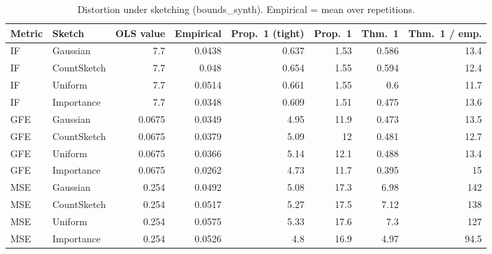 \begin{table}[t]
\centering
\small
\begin{tabular}{llrrrrrr}
\toprule
Metric & Sketch & OLS value & Empirical & Prop.~1 (tight) & Prop.~1 & Thm.~1 & Thm.~1 / emp. \\
\midrule
IF & Gaussian & 7.7 & 0.0438 & 0.637 & 1.53 & 0.586 & 13.4 \\
IF & CountSketch & 7.7 & 0.048 & 0.654 & 1.55 & 0.594 & 12.4 \\
IF & Uniform & 7.7 & 0.0514 & 0.661 & 1.55 & 0.6 & 11.7 \\
IF & Importance & 7.7 & 0.0348 & 0.609 & 1.51 & 0.475 & 13.6 \\
\midrule
GFE & Gaussian & 0.0675 & 0.0349 & 4.95 & 11.9 & 0.473 & 13.5 \\
GFE & CountSketch & 0.0675 & 0.0379 & 5.09 & 12 & 0.481 & 12.7 \\
GFE & Uniform & 0.0675 & 0.0366 & 5.14 & 12.1 & 0.488 & 13.4 \\
GFE & Importance & 0.0675 & 0.0262 & 4.73 & 11.7 & 0.395 & 15 \\
\midrule
MSE & Gaussian & 0.254 & 0.0492 & 5.08 & 17.3 & 6.98 & 142 \\
MSE & CountSketch & 0.254 & 0.0517 & 5.27 & 17.5 & 7.12 & 138 \\
MSE & Uniform & 0.254 & 0.0575 & 5.33 & 17.6 & 7.3 & 127 \\
MSE & Importance & 0.254 & 0.0526 & 4.8 & 16.9 & 4.97 & 94.5 \\
\bottomrule
\end{tabular}
\caption{Distortion under sketching (bounds_synth). Empirical = mean over repetitions.}
\label{tab:bounds_synth}
\end{table}